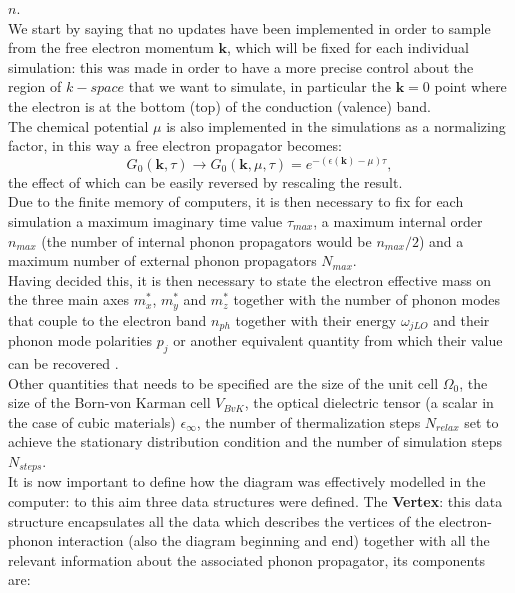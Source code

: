 $n$.\\
We start by saying that no updates have been implemented in order to sample from the free electron momentum $\mathbf{k}$, which will be fixed 
for each individual simulation: this was made in order to have a more precise control about the region of $k-space$ that we want to simulate, in particular 
the $\mathbf{k}=0$ point where the electron is at the bottom (top) of the conduction (valence) band.\\
The chemical potential $\mu$ is also implemented in the simulations as a normalizing factor, in this way a free electron propagator 
becomes:
\begin{equation}
    G_0(\mathbf{k},\tau)\to G_0(\mathbf{k}, \mu, \tau)=e^{-(\epsilon(\mathbf{k})-\mu)\tau},
\end{equation}
the effect of which can be easily reversed by rescaling the result.\\
Due to the finite memory of computers, it is then necessary to fix for each simulation a maximum imaginary time value $\tau_{max}$, a maximum 
internal order $n_{max}$ (the number of internal phonon propagators would be $n_{max}/2$) and a maximum number of external phonon propagators $N_{max}$.\\
Having decided this, it is then necessary to state the electron effective mass on the three main axes $m^*_{x}$, $m^*_{y}$ and $m^*_{z}$ together with 
the number of phonon modes that couple to the electron band $n_{ph}$ together with their energy $\omega_{jLO}$ and their phonon mode polarities 
$p_j$ or another equivalent quantity from which their value can be recovered \cite{de2023high}.\\
Other quantities that needs to be specified are the size of the unit cell $\Omega_0$, the size of the Born-von Karman cell $V_{BvK}$, the optical 
dielectric tensor (a scalar in the case of cubic materials) $\epsilon_{\infty}$, the number of thermalization steps $N_{relax}$ set to achieve the 
stationary distribution condition and the number of simulation steps $N_{steps}$.\\
It is now important to define how the diagram was effectively modelled in the computer: to this aim three data structures were 
defined.
The \textbf{Vertex}: this data structure encapsulates all the data which describes the vertices of the electron-phonon interaction (also the diagram beginning and end)
together with all the relevant information about the associated phonon propagator, its components are:
